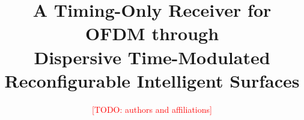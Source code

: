 \documentclass[journal,onecolumn,11pt,draftclsnofoot]{IEEEtran}
\newcommand{\TODO}[1]{\textcolor{red}{[TODO: #1]}}
\theoremstyle{remark}\newtheorem{remark}{Remark}
\begin{document}
\title{A Timing-Only Receiver for OFDM through\\ Dispersive Time-Modulated Reconfigurable Intelligent Surfaces}
\author{\TODO{authors and affiliations}}
\maketitle











\appendices


\end{document}
